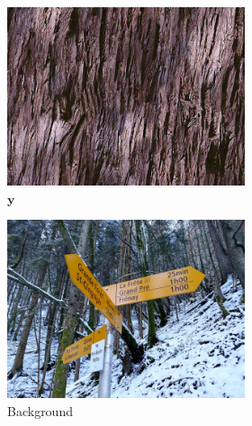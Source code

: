 \begin{figure}[]
    \begin{subfigure}{\textwidth}
        \centering
        \begin{subfigure}{0.24\textwidth}
            \centering
            \includegraphics[width=\textwidth]{images/04-experiment02/photo/wood/target.jpg}
            \caption*{\(\bm{y}\)}
        \end{subfigure}
        \hfill
        \begin{subfigure}{0.24\textwidth}
            \centering
            \includegraphics[width=\textwidth]{images/04-experiment02/photo/bg.jpg}
            \caption*{Background}
        \end{subfigure}
        \hfill
        \begin{subfigure}{0.24\textwidth}

\end{subfigure}
\end{subfigure}
\end{figure}
